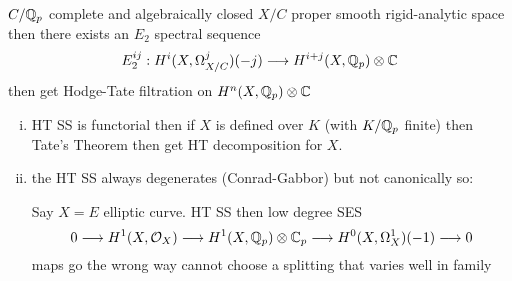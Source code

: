\begin{thm}[HT,SS]
$C/\mathbb{Q}_p$ complete and algebraically closed
$X/C$ proper smooth rigid-analytic space
then there exists an $E_2$ spectral sequence
	\[
	E_2^{ij}: H^i(X,\Omega^j_{X/C})(-j) \stackrel{}{\longrightarrow} H^{i+j}(X,\mathbb{Q}_p) \otimes \mathbb{C}
	\]
then get Hodge-Tate filtration on $H^n(X,\mathbb{Q}_p) \otimes \mathbb{C}$
\end{thm}


\begin{rem}
\begin{enumerate}[(i)]
\item HT SS is functorial
then if $X$ is defined over $K$ (with $K/\mathbb{Q}_p$ finite) then Tate's Theorem then get HT decomposition for $X$.

\item the HT SS always degenerates (Conrad-Gabbor) but not canonically so:

\begin{ex}
Say $X= E$ elliptic curve.
HT SS then low degree SES
	\[
	0 \stackrel{}{\longrightarrow} H^1(X, \mathcal{O}_X) \stackrel{}{\longrightarrow} H^1(X,\mathbb{Q}_p) \otimes \mathbb{C}_p \stackrel{}{\longrightarrow} H^0(X,\Omega_X^1)(-1) \stackrel{}{\longrightarrow} 0
	\]
maps go the wrong way
cannot choose a splitting that varies well in family
\end{ex}
\end{enumerate}
\end{rem}











